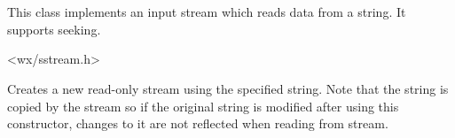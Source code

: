 
\section{}\label{wxstringinputstream}

This class implements an input stream which reads data from a string. It
supports seeking.




<wx/sstream.h>



\label{wxstringinputstreamctor}


Creates a new read-only stream using the specified string. Note that the string
is copied by the stream so if the original string is modified after using this
constructor, changes to it are not reflected when reading from stream. 

